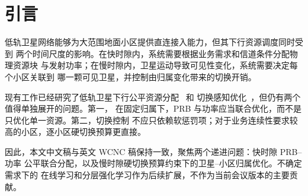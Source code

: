 
\section{引言}

低轨卫星网络能够为大范围地面小区提供直连接入能力，但其下行资源调度同时受到
两个时间尺度的影响。在快时隙内，系统需要根据业务需求和信道条件分配物理资源块
与发射功率；在慢时隙内，卫星运动导致可见性变化，系统需要决定每个小区关联到
哪一颗可见卫星，并控制由归属变化带来的切换开销。

现有工作已经研究了低轨卫星下行公平资源分配~\cite{leyva2023continent} 和
切换感知优化~\cite{afif2025handover}，但仍有两个值得单独展开的问题。第一，
在固定归属下，PRB 与功率应当联合优化，而不是只优化单一资源。第二，切换控制
不应只依赖软惩罚项；对于业务连续性要求较高的小区，逐小区硬切换预算更直接。

因此，本文中文稿与英文 WCNC 稿保持一致，聚焦两个递进问题：快时隙 PRB--功率
公平联合分配，以及慢时隙硬切换预算约束下的卫星--小区归属优化。不确定需求下的
在线学习和分层强化学习作为后续扩展，不作为当前会议版本的主要贡献。
